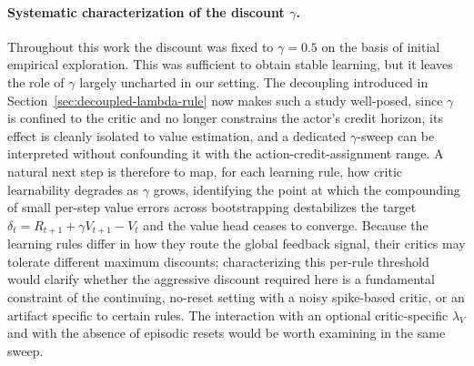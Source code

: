 \paragraph{Systematic characterization of the discount $\gamma$.}
Throughout this work the discount was fixed to $\gamma = 0.5$ on the basis of
initial empirical exploration. This was
sufficient to obtain stable learning, but it leaves the role of $\gamma$
largely uncharted in our setting. The decoupling introduced in
Section~\ref{sec:decoupled-lambda-rule} now makes such a study well-posed, since
$\gamma$ is confined to the critic and no longer constrains the actor's credit
horizon, its effect is cleanly isolated to value estimation, and a dedicated
$\gamma$-sweep can be interpreted without confounding it with the
action-credit-assignment range. A natural next step is therefore to map, for
each learning rule, how critic learnability degrades as $\gamma$ grows,
identifying the point at which the compounding of small per-step value errors
across bootstrapping destabilizes the target $\delta_t = R_{t+1} + \gamma V_{t+1} -
V_t$ and the value head ceases to converge. Because the learning rules differ
in how they route the global feedback signal, their critics may tolerate
different maximum discounts; characterizing this per-rule threshold would
clarify whether the aggressive discount required here is a fundamental
constraint of the continuing, no-reset setting with a noisy spike-based critic,
or an artifact specific to certain rules. The interaction with an optional
critic-specific $\lambda_V$ and with the absence of episodic resets would be
worth examining in the same sweep.

